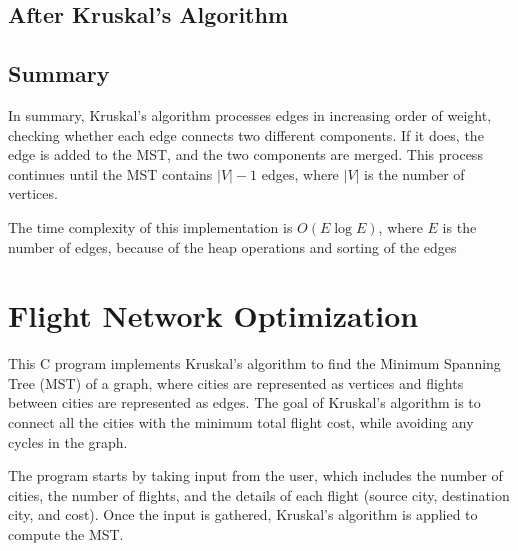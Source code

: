 \documentclass{book}
\begin{document}
\subsection{After Kruskal's Algorithm}


\subsection{Summary}

In summary, Kruskal's algorithm processes edges in increasing order of weight, checking whether each edge connects two different components. If it does, the edge is added to the MST, and the two components are merged. This process continues until the MST contains \( |V| - 1 \) edges, where \( |V| \) is the number of vertices.

The time complexity of this implementation is \(O(E \log E)\), where \(E\) is the number of edges, because of the heap operations and sorting of the edges

\newpage
\twocolumn
\section{Flight Network Optimization}

This C program implements Kruskal's algorithm to find the Minimum Spanning Tree (MST) of a graph, where cities are represented as vertices and flights between cities are represented as edges. The goal of Kruskal’s algorithm is to connect all the cities with the minimum total flight cost, while avoiding any cycles in the graph. 

The program starts by taking input from the user, which includes the number of cities, the number of flights, and the details of each flight (source city, destination city, and cost). Once the input is gathered, Kruskal’s algorithm is applied to compute the MST.
\end{document}
